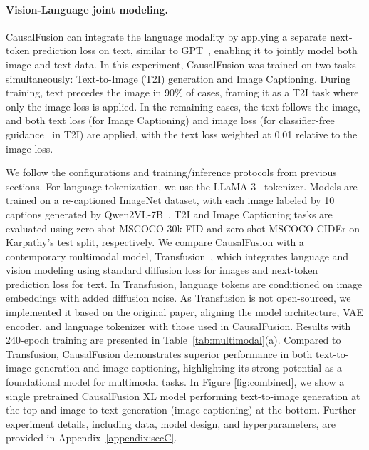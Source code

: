 \vspace{-5pt}
\paragraph{Vision-Language joint modeling.}
CausalFusion can integrate the language modality by applying a separate next-token prediction loss on text, similar to GPT~\cite{gpt1}, enabling it to jointly model both image and text data. In this experiment, CausalFusion was trained on two tasks simultaneously: Text-to-Image (T2I) generation and Image Captioning. During training, text precedes the image in 90\% of cases, framing it as a T2I task where only the image loss is applied. In the remaining cases, the text follows the image, and both text loss (for Image Captioning) and image loss (for classifier-free guidance~\cite{ho2022classifier} in T2I) are applied, with the text loss weighted at 0.01 relative to the image loss.

We follow the configurations and training/inference protocols from previous sections. For language tokenization, we use the LLaMA-3~\cite{llama3} tokenizer. Models are trained on a re-captioned ImageNet dataset, with each image labeled by 10 captions generated by Qwen2VL-7B~\cite{qwen2vl}. T2I and Image Captioning tasks are evaluated using zero-shot MSCOCO-30k FID and zero-shot MSCOCO CIDEr on Karpathy's test split, respectively. We compare CausalFusion with a contemporary multimodal model, Transfusion~\cite{transfusion}, which integrates language and vision modeling using standard diffusion loss for images and next-token prediction loss for text. In Transfusion, language tokens are conditioned on image embeddings with added diffusion noise. As Transfusion is not open-sourced, we implemented it based on the original paper, aligning the model architecture, VAE encoder, and language tokenizer with those used in CausalFusion.
Results with 240-epoch training are presented in Table~\ref{tab:multimodal}(a). Compared to Transfusion, CausalFusion demonstrates superior performance in both text-to-image generation and image captioning, highlighting its strong potential as a foundational model for multimodal tasks. 
In Figure \ref{fig:combined}, we show a single pretrained CausalFusion XL model performing text-to-image generation at the top and image-to-text generation (image captioning) at the bottom. Further experiment details, including data, model design, and hyperparameters, are provided in Appendix~\ref{appendix:secC}.

\vspace{-5pt}
